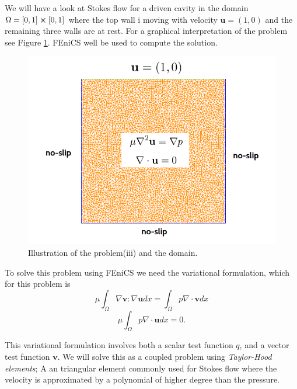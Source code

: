 \documentclass[11pt,a4paper,english]{article}
\numberwithin{equation}{section}
\begin{document}
We will have a look at Stokes flow for a driven cavity in the domain $\Omega = [0,1] \cross [0,1]$ where the top wall i moving with velocity $\mathbf{u} = (1,0)$ and the remaining three walls are at rest. For a graphical interpretation of the problem see Figure \ref{fig:stokes_square}. FEniCS well be used to compute the solution. 

\begin{figure}[h!]
\begin{center}
  \includegraphics[scale=0.3]{stokes_square.png}
  \end{center}
  \caption{Illustration of the problem(iii) and the domain.}
  \label{fig:stokes_square}
\end{figure}

To solve this problem using FEniCS we need the variational formulation, which for this problem is
\begin{equation}
\mu \int_\Omega \nabla \mathbf{v}:\nabla \mathbf{u} dx = \int_\Omega p \nabla \cdot \mathbf{v} dx 
\end{equation}
\begin{equation}
\mu \int_\Omega p\nabla \cdot \mathbf{u} dx = 0.
\end{equation}

This variational formulation involves both a scalar test function $q$, and a vector test function $\mathbf{v}$. We will solve this as a coupled problem using \emph{Taylor-Hood elements}; A an triangular element commonly used for Stokes flow where the velocity is approximated by a polynomial of higher degree than the pressure. 
\end{document}
